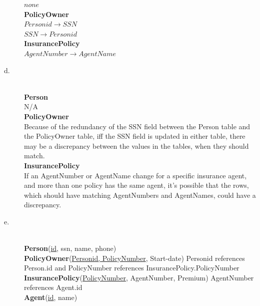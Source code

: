 \documentclass{article}
\begin{document}
\begin{description}
$none$\\
\textbf{PolicyOwner\\}
$Personid \rightarrow SSN$\\
$SSN \rightarrow Personid$\\
\textbf{InsurancePolicy\\}
$AgentNumber \rightarrow AgentName$
\item[d.]
\textbf{\\Person\\}
N/A\\
\textbf{PolicyOwner\\}
Because of the redundancy of the SSN field between the Person table and the
PolicyOwner table, iff the SSN field is updated in either table, there may
be a discrepancy between the values in the tables, when they should match.\\
\textbf{InsurancePolicy\\}
If an AgentNumber or AgentName change for a specific insurance agent, and
more than one policy has the same agent, it's possible that the rows, which
should have matching AgentNumbers and AgentNames, could have a discrepancy.

\pagebreak

\item[e.]
\textbf{\\Person}(\underline{id}, ssn, name, phone)\\
\textbf{PolicyOwner}(\underline{Personid, PolicyNumber}, Start-date) Personid 
references Person.id and PolicyNumber references InsurancePolicy.PolicyNumber\\
\textbf{InsurancePolicy}(\underline{PolicyNumber}, AgentNumber, Premium) 
AgentNumber references Agent.id\\
\textbf{Agent}(\underline{id}, name)
\end{description}
\end{document}
